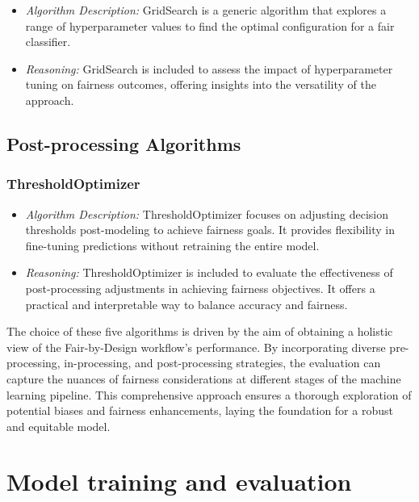 \begin{itemize}

    \item \emph{Algorithm Description:} GridSearch is a generic algorithm that explores a range of hyperparameter values to find the optimal configuration for a fair classifier.

    \item \emph{Reasoning:} GridSearch is included to assess the impact of hyperparameter tuning on fairness outcomes, offering insights into the versatility of the approach.

\end{itemize}

\subsection{Post-processing Algorithms}

\subsubsection{ThresholdOptimizer}

\begin{itemize}

    \item \emph{Algorithm Description:} ThresholdOptimizer focuses on adjusting decision thresholds post-modeling to achieve fairness goals. It provides flexibility in fine-tuning predictions without retraining the entire model.

    \item \emph{Reasoning:} ThresholdOptimizer is included to evaluate the effectiveness of post-processing adjustments in achieving fairness objectives. It offers a practical and interpretable way to balance accuracy and fairness.

\end{itemize}

The choice of these five algorithms is driven by the aim of obtaining a holistic view of the Fair-by-Design workflow's performance. By incorporating diverse pre-processing, in-processing, and post-processing strategies, the evaluation can capture the nuances of fairness considerations at different stages of the machine learning pipeline. This comprehensive approach ensures a thorough exploration of potential biases and fairness enhancements, laying the foundation for a robust and equitable model.

\section{Model training and evaluation}
\label{section:val_mt_eval}

